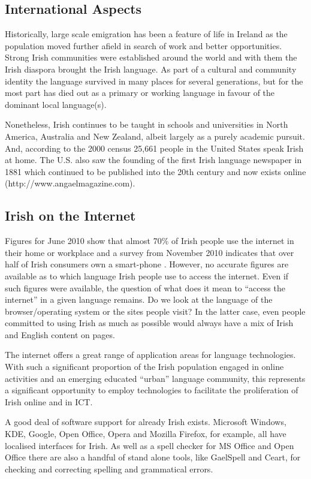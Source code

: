\documentclass[]{../../metanetpaper}
\begin{document}
\begin{multicols}{2}
\subsection{International Aspects}

Historically, large scale emigration has been a feature of life in Ireland as the population moved further afield in search of work and better opportunities. Strong Irish communities were established around the world and with them the Irish diaspora brought the Irish language. As part of a cultural and community identity the language survived in many places for several generations, but for the most part has died out as a primary or working language in favour of the dominant local language(s). 

Nonetheless, Irish continues to be taught in schools and universities in North America, Australia and New Zealand, albeit largely as a purely academic pursuit. And, according to the 2000 census 25,661 people in the United States speak Irish at home. The U.S. also saw the founding of the first Irish language newspaper in 1881 which continued to be published into the 20th century and now exists online (http://www.angaelmagazine.com). 

\subsection{Irish on the Internet}
Figures for June 2010 show that almost 70\% of Irish people use the internet in their home or workplace \cite{internetstats} and a survey from November 2010 indicates that over half of Irish consumers own a smart-phone \cite{mindshare}. However, no accurate figures are available as to which language Irish people use to access the internet. Even if such figures were available, the question of what does it mean to ``access the internet'' in a given language remains. Do we look at the language of the browser/operating system or the sites people visit? In the latter case, even people committed to using Irish as much as possible would always have a mix of Irish and English content on pages.

The internet offers a great range of application areas for language technologies. With such a significant proportion of the Irish population engaged in online activities and an emerging educated ``urban'' language community, this represents a significant opportunity to employ technologies to facilitate the proliferation of Irish online and in ICT.

A good deal of software support for already Irish exists. Microsoft Windows, KDE, Google, Open Office, Opera and Mozilla Firefox, for example, all have localised interfaces for Irish. As well as a spell checker for MS Office and Open Office there are also a handful of stand alone tools, like GaelSpell and Ceart, for checking and correcting spelling and grammatical errors.



\end{multicols}
\end{document}
